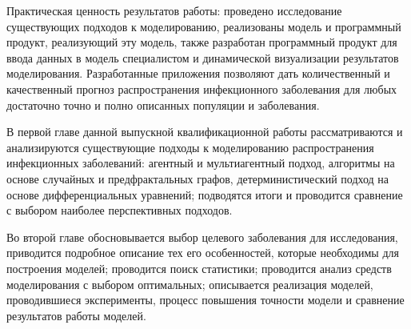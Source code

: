 Практическая ценность результатов работы: проведено исследование существующих подходов к моделированию,	реализованы модель  и программный продукт, реализующий эту модель, также разработан программный продукт для ввода данных в модель специалистом и динамической визуализации результатов моделирования. Разработанные приложения позволяют дать количественный и качественный прогноз распространения инфекционного заболевания для любых  достаточно точно и полно описанных популяции и заболевания.

В первой главе данной выпускной квалификационной работы рассматриваются и анализируются существующие подходы к моделированию распространения инфекционных заболеваний: агентный и мультиагентный подход, алгоритмы на основе случайных  и предфрактальных графов, детерминистический подход на основе дифференциальных уравнений; подводятся итоги и проводится сравнение с выбором наиболее перспективных подходов.

Во второй главе обосновывается выбор целевого заболевания для исследования, приводится подробное описание тех его особенностей, которые необходимы для построения моделей; проводится поиск статистики; проводится анализ средств моделирования с выбором оптимальных; описывается реализация  моделей, проводившиеся эксперименты, процесс повышения точности модели  и сравнение результатов работы моделей.
